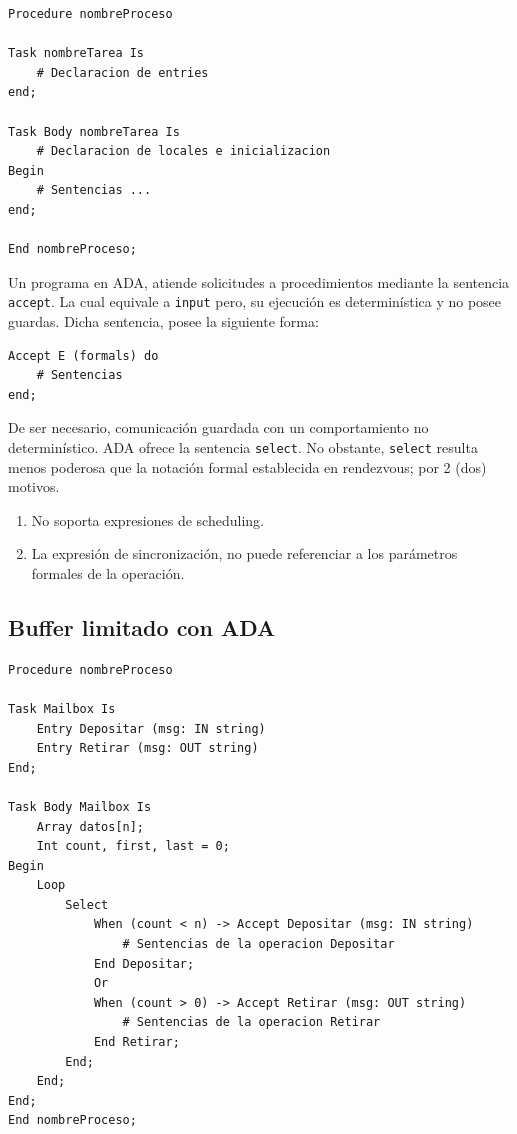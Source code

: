 \documentclass[a4paper, 10pt]{report}
\begin{document}
\begin{lstlisting}
Procedure nombreProceso

Task nombreTarea Is
    # Declaracion de entries
end;

Task Body nombreTarea Is
    # Declaracion de locales e inicializacion
Begin
    # Sentencias ...
end;

End nombreProceso;
\end{lstlisting}

Un programa en ADA, atiende solicitudes a procedimientos mediante la sentencia \lstinline{accept}. La cual equivale a \lstinline{input} pero, su ejecución es determinística y no posee guardas. Dicha sentencia, posee la siguiente forma:

\begin{lstlisting}
Accept E (formals) do
    # Sentencias
end;
\end{lstlisting}

De ser necesario, comunicación guardada con un comportamiento no determinístico. ADA ofrece la sentencia \lstinline{select}. No obstante, \lstinline{select} resulta menos poderosa que la notación formal establecida en rendezvous; por 2 (dos) motivos.

\begin{enumerate}
    \item No soporta expresiones de scheduling.
    \item La expresión de sincronización, no puede referenciar a los parámetros formales de la operación.
\end{enumerate}

\subsection{Buffer limitado con ADA}

\begin{lstlisting}
Procedure nombreProceso

Task Mailbox Is
    Entry Depositar (msg: IN string)
    Entry Retirar (msg: OUT string)
End;
    
Task Body Mailbox Is
    Array datos[n];
    Int count, first, last = 0;
Begin
    Loop
        Select
            When (count < n) -> Accept Depositar (msg: IN string)
                # Sentencias de la operacion Depositar
            End Depositar;
            Or
            When (count > 0) -> Accept Retirar (msg: OUT string)
                # Sentencias de la operacion Retirar
            End Retirar;
        End;
    End;
End;
End nombreProceso;
\end{lstlisting}
\end{document}
